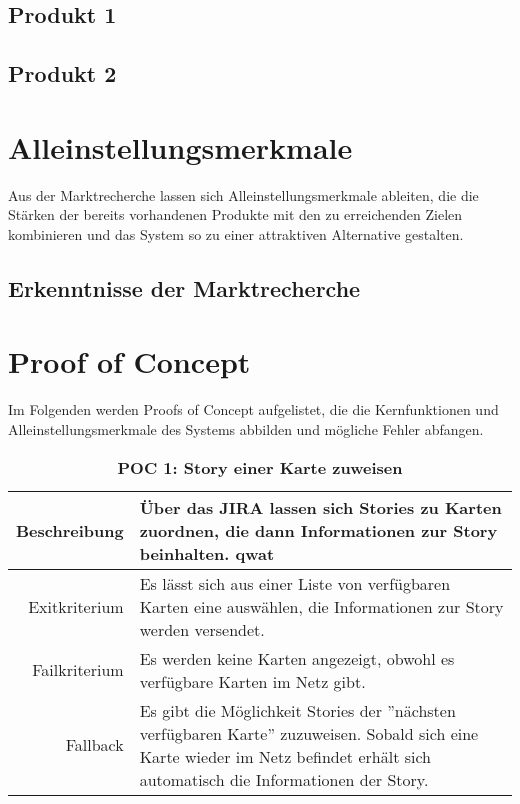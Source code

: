 \documentclass[12pt,titlepage]{scrartcl}
\begin{document}
		\subsection{Produkt 1}
		\subsection{Produkt 2}
	\newpage
	\section{Alleinstellungsmerkmale}	
	Aus der Marktrecherche lassen sich Alleinstellungsmerkmale ableiten, die die Stärken der bereits vorhandenen Produkte mit den zu erreichenden Zielen kombinieren und das System so zu einer attraktiven Alternative gestalten.
		\subsection{Erkenntnisse der Marktrecherche}
	\newpage
	\section{Proof of Concept}
	Im Folgenden werden Proofs of Concept aufgelistet, die die Kernfunktionen und Alleinstellungsmerkmale des Systems abbilden und mögliche Fehler abfangen.

\begin{table}[H]
\centering
\caption{\textbf{POC 1: Story einer Karte zuweisen}}
\label{poc1}
\begin{tabularx}{\linewidth}{|r|X|}
\hline
Beschreibung  & Über das JIRA lassen sich Stories zu Karten zuordnen, die dann Informationen zur Story beinhalten. qwat                                  \\ \hline
Exitkriterium & Es lässt sich aus einer Liste von verfügbaren Karten eine auswählen, die Informationen zur Story werden versendet. \\ \hline
Failkriterium & Es werden keine Karten angezeigt, obwohl es verfügbare Karten im Netz gibt. \\ \hline
Fallback      & Es gibt die Möglichkeit Stories der ''nächsten verfügbaren Karte'' zuzuweisen. Sobald sich eine Karte wieder im Netz befindet erhält sich automatisch die Informationen der Story. \\ \hline
\end{tabularx}
\end{table}
\end{document}
